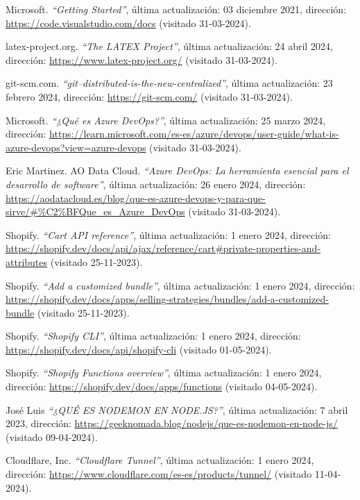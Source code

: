 \documentclass[12pt]{article}
\begin{document}
\begin{thebibliography}{100}
    Microsoft.
    \textit{``Getting Started''}, última actualización: 03 diciembre 2021, dirección: \url{https://code.visualstudio.com/docs} (visitado 31-03-2024).

    latex-project.org.
    \textit{``The LATEX Project''}, última actualización: 24 abril 2024, dirección: \url{https://www.latex-project.org/} (visitado 31-03-2024).

    git-scm.com.
    \textit{``git--distributed-is-the-new-centralized''}, última actualización: 23 febrero 2024, dirección: \url{https://git-scm.com/} (visitado 31-03-2024).

    Microsoft.
    \textit{``¿Qué es Azure DevOps?''}, última actualización: 25 marzo 2024, dirección: \url{https://learn.microsoft.com/es-es/azure/devops/user-guide/what-is-azure-devops?view=azure-devops} (visitado 31-03-2024).

    Eric Martinez. AO Data Cloud.
    \textit{``Azure DevOps: La herramienta esencial para el desarrollo de software''}, última actualización: 26 enero 2024, dirección: \url{https://aodatacloud.es/blog/que-es-azure-devops-y-para-que-sirve/#%C2%BFQue_es_Azure_DevOps} (visitado 31-03-2024).

    Shopify.
    \textit{``Cart API reference''}, última actualización: 1 enero 2024, dirección: \url{https://shopify.dev/docs/api/ajax/reference/cart#private-properties-and-attributes} (visitado 25-11-2023).

    Shopify.
    \textit{``Add a customized bundle''}, última actualización: 1 enero 2024, dirección: \url{https://shopify.dev/docs/apps/selling-strategies/bundles/add-a-customized-bundle} (visitado 25-11-2023).

    Shopify.
    \textit{``Shopify CLI''}, última actualización: 1 enero 2024, dirección: \url{https://shopify.dev/docs/api/shopify-cli} (visitado 01-05-2024).

    Shopify.
    \textit{``Shopify Functions overview''}, última actualización: 1 enero 2024, dirección: \url{https://shopify.dev/docs/apps/functions} (visitado 04-05-2024).

    José Luis
    \textit{``¿QUÉ ES NODEMON EN NODE.JS?''}, última actualización: 7 abril 2023, dirección: \url{https://geeknomada.blog/nodejs/que-es-nodemon-en-node-js/} (visitado 09-04-2024).

    Cloudflare, Inc.
    \textit{``Cloudflare Tunnel''}, última actualización: 1 enero 2024, dirección: \url{https://www.cloudflare.com/es-es/products/tunnel/} (visitado 11-04-2024).

\end{thebibliography}
\end{document}
